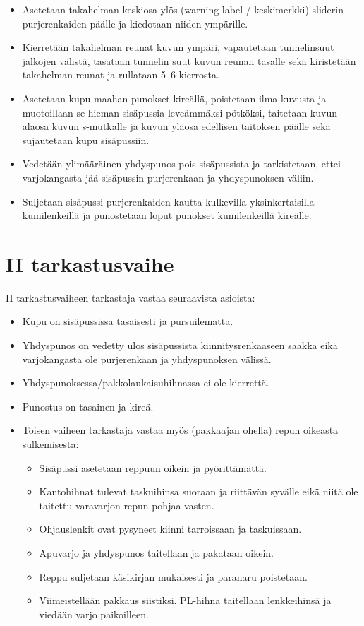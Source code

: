 \begin{itemize}
\item  Asetetaan takahelman keskiosa ylös (warning label / keskimerkki) sliderin purjerenkaiden päälle ja kiedotaan niiden ympärille. 
\item  Kierretään takahelman reunat kuvun ympäri, vapautetaan tunnelinsuut jalkojen välistä, tasataan tunnelin suut kuvun reunan tasalle sekä kiristetään takahelman reunat ja rullataan 5–6 kierrosta. 
\item  Asetetaan kupu maahan punokset kireällä, poistetaan ilma kuvusta ja muotoillaan se hieman sisäpussia leveämmäksi pötköksi, taitetaan kuvun alaosa kuvun s-mutkalle ja kuvun yläosa edellisen taitoksen päälle sekä sujautetaan kupu sisäpussiin.  
\item  Vedetään ylimääräinen yhdyspunos pois sisäpussista ja tarkistetaan, ettei varjokangasta jää sisäpussin purjerenkaan ja yhdyspunoksen väliin.  
\item  Suljetaan sisäpussi purjerenkaiden kautta kulkevilla yksinkertaisilla kumilenkeillä ja punostetaan loput punokset kumilenkeillä kireälle. 
\end{itemize}
\section{ II tarkastusvaihe }
\label{pakkaustarkastus-ii-tarkastusvaihe}


II tarkastusvaiheen tarkastaja vastaa seuraavista asioista: 

\begin{itemize}
\item  Kupu on sisäpussissa tasaisesti ja pursuilematta. 
\item  Yhdyspunos on vedetty ulos sisäpussista kiinnitysrenkaaseen saakka eikä varjokangasta ole purjerenkaan ja yhdyspunoksen välissä. 
\item  Yhdyspunoksessa/pakkolaukaisuhihnassa ei ole kierrettä. 
\item  Punostus on tasainen ja kireä. 
\item  Toisen vaiheen tarkastaja vastaa myös (pakkaajan ohella) repun oikeasta sulkemisesta: 
	\begin{itemize}
	\item  Sisäpussi asetetaan reppuun oikein ja pyörittämättä. 
	\item  Kantohihnat tulevat taskuihinsa suoraan ja riittävän syvälle eikä niitä ole taitettu varavarjon repun pohjaa vasten. 
	\item  Ohjauslenkit ovat pysyneet kiinni tarroissaan ja taskuissaan. 
	\item  Apuvarjo ja yhdyspunos taitellaan ja pakataan oikein. 
	\item  Reppu suljetaan käsikirjan mukaisesti ja paranaru poistetaan. 
	\item  Viimeistellään pakkaus siistiksi. PL-hihna taitellaan lenkkeihinsä ja viedään varjo paikoilleen. 
	\end{itemize}
\end{itemize}

